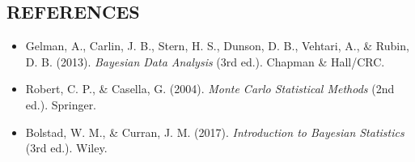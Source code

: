 \documentclass[12pt,a4paper]{article}
\begin{document}
\subsection*{REFERENCES}
\begin{itemize}
    \item Gelman, A., Carlin, J. B., Stern, H. S., Dunson, D. B., Vehtari, A., \& Rubin, D. B. (2013). \textit{Bayesian Data Analysis} (3rd ed.). Chapman \& Hall/CRC.
    \item Robert, C. P., \& Casella, G. (2004). \textit{Monte Carlo Statistical Methods} (2nd ed.). Springer.
    \item Bolstad, W. M., \& Curran, J. M. (2017). \textit{Introduction to Bayesian Statistics} (3rd ed.). Wiley.
\end{itemize}
\end{document}
